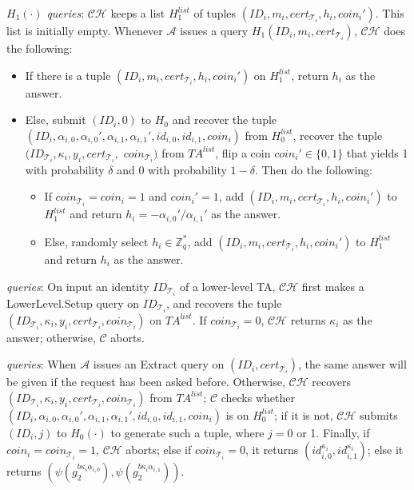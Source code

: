 \documentclass[10pt,journal,compsoc]{IEEEtran}
\begin{document}
\smallskip \noindent $H_1(\cdot)$ \emph{queries}: $\mathcal {CH}$ keeps a list
$H_1^{list}$ of tuples $(ID_i, m_i, cert_{\mathcal{T}_i}, h_i, coin_i')$. This list
is initially empty. Whenever $\mathcal {A}$ issues a query
$H_1(ID_i,m_i,cert_{\mathcal{T}_i})$, $\mathcal {CH}$ does the following:
\begin{itemize}
  \item If there is a tuple $(ID_i,m_i, cert_{\mathcal{T}_i},h_i,coin_i')$ on
  $H_1^{list}$, return $h_i$ as the answer.
  \item Else, submit $(ID_i,0)$ to $H_0$ and recover the tuple
       $(ID_i,\alpha_{i,0},\alpha_{i,0}',\alpha_{i,1},\alpha_{i,1}',id_{i,0},id_{i,1},coin_i)$ from $H_0^{list}$,
       recover the tuple $(ID_{\mathcal{T}_i},\kappa_i,y_i,cert_{\mathcal{T}_i},$ $coin_{\mathcal{T}_i})$
from $TA^{list}$, flip a coin $coin_i'\in \{0,1\}$ that yields 1 with probability $\delta$ and 0
with probability $1-\delta$. Then do the following:
     \begin{itemize}
       \item If $coin_{\mathcal{T}_i}=coin_i=1$ and $coin_i'=1$, add $(ID_i,m_i,
       cert_{\mathcal{T}_i},h_i,coin_i')$ to $H_1^{list}$ and
       return $h_i=-\alpha_{i,0}'/\alpha_{i,1}'$ as the answer.

       \item Else, randomly select $h_i\in \mathbb{Z}_q^*$, add
       $(ID_i,m_i, cert_{\mathcal{T}_i},h_i,coin_i')$ to $H_1^{list}$ and return
       $h_i$ as the answer.
     \end{itemize}
\end{itemize}

 \emph{queries}: On input an identity
$ID_{\mathcal{T}_i}$ of a lower-level TA, $\mathcal {CH}$ first makes
a {\sf LowerLevel.Setup} query on $ID_{\mathcal{T}_i}$, and recovers the
tuple
$(ID_{\mathcal{T}_i},\kappa_i,y_i,cert_{\mathcal{T}_i},coin_{\mathcal{T}_i})$
on $TA^{list}$. If $coin_{\mathcal{T}_i}=0$, $\mathcal {CH}$ returns
$\kappa_i$ as the answer; otherwise, $\mathcal{C}$ aborts.

\smallskip
{} \emph{queries}: When $\mathcal {A}$ issues
an {\sf Extract} query on $(ID_i,cert_{\mathcal{T}_i})$, the same
answer will be given if the request has been asked before.
Otherwise, $\mathcal {CH}$ recovers
$(ID_{\mathcal{T}_i},\kappa_i,y_i,cert_{\mathcal{T}_i},coin_{\mathcal{T}_i})$
from $TA^{list}$; $\mathcal{C}$ checks whether
$(ID_i,\alpha_{i,0},\alpha_{i,0}',\alpha_{i,1},\alpha_{i,1}',id_{i,0},id_{i,1},coin_i)$
is on $H_0^{list}$; if it is not, $\mathcal {CH}$ submits
$(ID_i,j)$ to $H_0(\cdot)$ to generate such a tuple, where $j=0$ or
1. Finally,
if $coin_i=coin_{\mathcal{T}_i}=1$, $\mathcal {CH}$ aborts;
else if $coin_{\mathcal{T}_i}=0$, it returns
  $(id_{i,0}^{\kappa_i},id_{i,1}^{\kappa_i})$; else it returns $(\psi(g_2^{b\kappa_i\alpha_{i,0}}),\psi(g_2^{b\kappa_i\alpha_{i,1}}))$.
\end{document}
